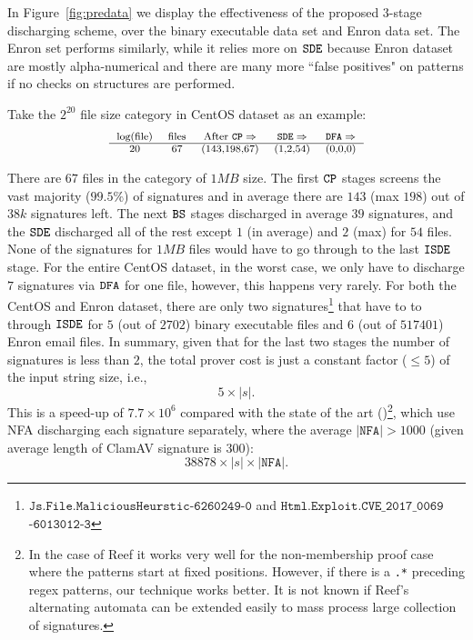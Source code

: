 In Figure\ \ref{fig:predata} we display the effectiveness of the proposed
$3$-stage discharging scheme, over the binary executable data set and
Enron data set. The Enron set performs similarly, while it relies more
on $\texttt{SDE}$ because Enron dataset are mostly alpha-numerical and there are 
many more ``false positives" on patterns if no checks on structures are
performed.

Take the $2^{20}$ file size category in CentOS dataset as an example:
\[
\begin{footnotesize}
\begin{tabular}{c c c c c c c}
log(file) & files & After $\cp \Rightarrow$ & $\sde \Rightarrow$ & 
	$\dfa \Rightarrow$ \\
\hline
20  &   67       &  (143,198,67)       &  (1,2,54)      &  (0,0,0)   \\
\end{tabular}
\end{footnotesize}
\]

There are $67$ files in the category of $1MB$ size. The first $\texttt{CP}$ stages
screens the vast majority ($99.5\%$) of signatures and in average there are
$143$ (max $198$) out of $38k$ signatures left. The next $\texttt{BS}$ stages
discharged in average $39$ signatures, and the $\texttt{SDE}$ discharged all of
the rest except $1$ (in average) and $2$ (max) for $54$ files. 
None of the signatures for $1MB$ files would have to go through to the
last $\texttt{ISDE}$ stage. For the entire CentOS dataset,
in the worst case, we only have
to discharge $7$ signatures via $\texttt{DFA}$ for one file, however, this happens
very rarely. For both the CentOS and Enron dataset,
there are only two signatures\footnote{$\texttt{Js.File.MaliciousHeurstic-6260249-0}$ and $\texttt{Html.Exploit.CVE\_2017\_0069}$ $\texttt{-6013012-3}$}
that have to to through $\texttt{ISDE}$ for $5$ (out of $2702$) binary executable files
and $6$ (out of $517401$) Enron email files.
In summary, given that for the last two stages the number of signatures is less than
$2$, the total prover cost is just a constant factor ($\leq 5$) of the
input string size, i.e.,
\[
	5 \times |s|.
\]
This is a speed-up of $7.7\times 10^{6}$
compared with the state of the art (\cite{Zombie23,Luo23})\footnote{In the case of Reef \cite{Reef} it works very well for the non-membership proof case 
where the patterns start
at fixed positions. However, if there is a \texttt{.*} preceding regex patterns,
our technique works better. It is not known if Reef's alternating automata 
can be extended easily to mass process large collection of signatures.}, which
use NFA discharging each
signature separately, where the average $|\texttt{NFA}|>1000$
(given average length of ClamAV signature is $300$):
\[
38878 \times |s| \times |\texttt{NFA}|.
\]

